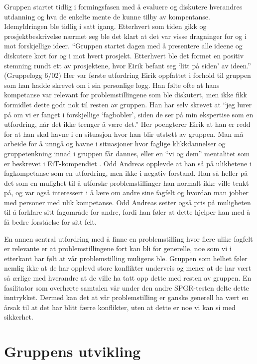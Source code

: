 \documentclass[a4paper,norsk,oneside]{article}
\begin{document}
Gruppen startet tidlig i formingsfasen med å evaluere og diskutere hverandres utdanning og hva de enkelte mente de kunne tilby av kompentanse. Idemyldringen ble tidlig i satt igang. Etterhvert som tiden gikk og prosjektbeskrivelse nærmet seg ble det klart at det var visse dragninger for og i mot forskjellige ideer. “Gruppen startet dagen med å presentere alle ideene og diskutere kort for og i mot hvert prosjekt. Etterhvert ble det formet en positiv stemning rundt ett av prosjektene, hvor Eirik befant seg ‘litt på siden’ av ideen.” (Gruppelogg 6/02) Her var første utfordring Eirik oppfattet i forhold til gruppen som han hadde skrevet om i sin personlige logg. Han følte ofte at hans kompetanse var relevant for problemstillingene som ble diskutert, men ikke fikk formidlet dette godt nok til resten av gruppen. Han har selv skrevet at “jeg lurer på om vi er fanget i forskjellige ‘fagbobler’, siden de ser på min ekspertise som en utfordring, når det ikke trenger å være det.”  Her poengterer Eirik at han er redd for at han skal havne i en situasjon hvor han blir utstøtt av gruppen. Man må arbeide for å unngå og havne i situasjoner hvor faglige klikkdannelser og gruppetenkning innad i gruppen får dannes, eller en “vi og dem” mentalitet som er beskrevet i EiT-kompendiet \cite{johnson2008joining}. Odd Andreas opplevde at han så på ulikhetene i fagkompetanse som en utfordring, men ikke i negativ forstand. Han så heller på det som en mulighet til å utforske problemstillinger han normalt ikke ville tenkt på, og var også interessert i å lære om andre sine fagfelt og hvordan man jobber med personer med ulik kompetanse. Odd Andreas setter også pris på muligheten til å forklare sitt fagområde for andre, fordi han føler at dette hjelper han med å få bedre forståelse for sitt felt.

En annen sentral utfordring med å finne en problemstilling hvor flere ulike fagfelt er relevante er at problemstillingene fort kan bli for generelle, noe som vi i etterkant har følt at vår problemstilling muligens ble. Gruppen som helhet føler nemlig ikke at de har opplevd store konflikter underveis og mener at de har vært så ærlige med hverandre at de ville ha tatt opp dette med resten av gruppen. En fasilitator som overhørte samtalen vår under den andre SPGR-testen delte dette inntrykket. Dermed kan det at vår problemstilling er ganske generell ha vært en årsak til at det har blitt færre konflikter, uten at dette er noe vi kan si med sikkerhet.

\section{Gruppens utvikling}
\end{document}
